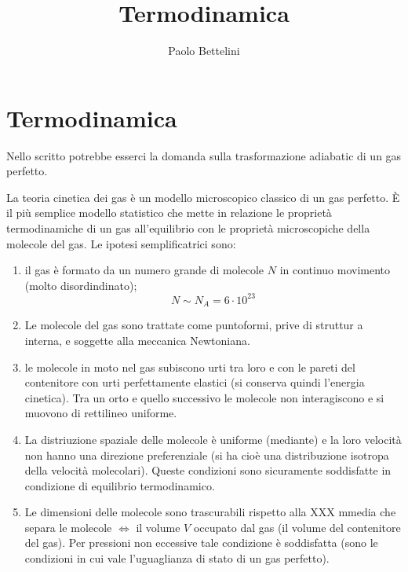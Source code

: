 \documentclass[a4paper]{article}
\title{Termodinamica}
\author{Paolo Bettelini}
\date{}
\begin{document}
\maketitle
\tableofcontents

\section{Termodinamica}

Nello scritto potrebbe esserci la domanda sulla trasformazione adiabatic di un gas perfetto.

La teoria cinetica dei gas è un modello microscopico classico di un gas perfetto.
È il più semplice modello statistico che mette in relazione le proprietà
termodinamiche di un gas all'equilibrio
con le proprietà microscopiche della molecole del gas.
Le ipotesi semplificatrici sono:
\begin{enumerate}
    \item il gas è formato da un numero grande di molecole \(N\)
        in continuo movimento (molto disordindinato);
    \[
        N \sim N_A = 6 \cdot 10^{23}
    \]
    \item Le molecole del gas sono trattate come puntoformi, prive di struttur a interna,
    e soggette alla meccanica Newtoniana.
    \item le molecole in moto nel gas subiscono urti tra loro e con le pareti del contenitore
    con urti perfettamente elastici (si conserva quindi l'energia cinetica).
    Tra un orto e quello successivo le molecole non interagiscono e si muovono di rettilineo uniforme.
    \item La distriuzione spaziale delle molecole è uniforme (mediante)
        e la loro velocità non hanno una direzione preferenziale
        (si ha cioè una distribuzione isotropa della velocità molecolari).
        Queste condizioni sono sicuramente soddisfatte in condizione di equilibrio
        termodinamico.
    \item Le dimensioni delle molecole sono trascurabili rispetto alla XXX
    mmedia che separa le molecole \(\iff\) il volume \(V\) occupato
    dal gas (il volume del contenitore del gas).
    Per pressioni non eccessive tale condizione è soddisfatta (sono le condizioni in cui
    vale l'uguaglianza di stato di un gas perfetto).
\end{enumerate}
\end{document}
